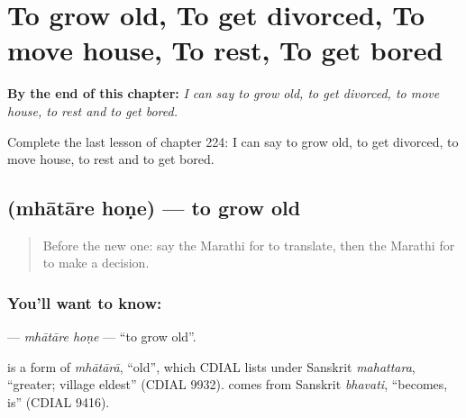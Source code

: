 
\chapter{To grow old, To get divorced, To move house, To rest, To get bored}
\label{ch:mr-to-grow-old-to-get-divorced-to-move-house-to-rest-to-get-bored}

\begin{chapteropening}
\textbf{By the end of this chapter:} \emph{I can say to grow old, to get divorced, to move house, to rest and to get bored.}

Complete the last lesson of chapter 224: I can say to grow old, to get divorced, to move house, to rest and to get bored.
\end{chapteropening}

\section[\texorpdfstring{\mr{म्हातारे} \mr{होणे} (mhātāre hoṇe)}{म्हातारे होणे (mhātāre hoṇe)}]{  (mhātāre hoṇe) — to grow old}

\label{lesson:MR-C224-mhatare-hone}



\begin{quote}
Before the new one: say the Marathi for to translate, then the Marathi for to make a decision.
\end{quote}

\subsection*{You'll want to know:  }
\textbf{ } — \emph{mhātāre hoṇe} — \textquotedblleft{}to grow old\textquotedblright{}.

\begin{cousinweb}
\textbf{} is a form of \emph{mhātārā}, \textquotedblleft{}old\textquotedblright{}, which CDIAL lists under Sanskrit \emph{mahattara}, \textquotedblleft{}greater; village eldest\textquotedblright{} (CDIAL 9932). \textbf{} comes from Sanskrit \emph{bhavati}, \textquotedblleft{}becomes, is\textquotedblright{} (CDIAL 9416).
\end{cousinweb}

